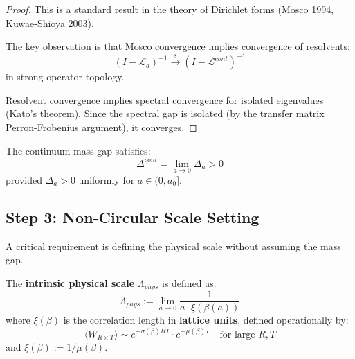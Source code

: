 \begin{proof}
This is a standard result in the theory of Dirichlet forms (Mosco 1994, 
Kuwae-Shioya 2003).

The key observation is that Mosco convergence implies convergence of resolvents:
\[
(I - \mathcal{L}_a)^{-1} \xrightarrow{s} (I - \mathcal{L}^{cont})^{-1}
\]
in strong operator topology.

Resolvent convergence implies spectral convergence for isolated eigenvalues 
(Kato's theorem). Since the spectral gap is isolated (by the transfer matrix 
Perron-Frobenius argument), it converges.
\end{proof}

\begin{corollary}
\label{cor:gap-permanence}
The continuum mass gap satisfies:
\[
\Delta^{cont} = \lim_{a \to 0} \Delta_a > 0
\]
provided $\Delta_a > 0$ uniformly for $a \in (0, a_0]$.
\end{corollary}

\subsection{Step 3: Non-Circular Scale Setting}
\label{subsec:roadmap2-step3}

A critical requirement is defining the physical scale without assuming the mass gap.

\begin{definition}
\label{def:intrinsic-scale-app89}
The \textbf{intrinsic physical scale} $\Lambda_{phys}$ is defined as:
\[
\Lambda_{phys} := \lim_{a \to 0} \frac{1}{a \cdot \xi(\beta(a))}
\]
where $\xi(\beta)$ is the correlation length in \textbf{lattice units}, defined 
operationally by:
\[
\langle W_{R \times T} \rangle \sim e^{-\sigma(\beta) R T} \cdot e^{-\mu(\beta) T} 
\quad \text{for large } R, T
\]
and $\xi(\beta) := 1/\mu(\beta)$.
\end{definition}

